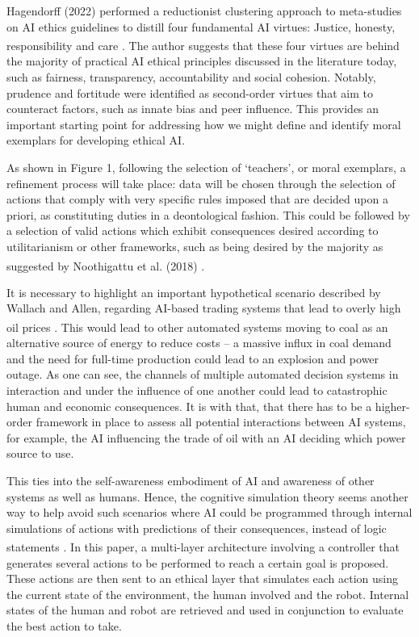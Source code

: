 \documentclass[10pt]{article}
\begin{document}
Hagendorff (2022) performed a reductionist clustering approach to meta-studies on AI ethics guidelines to distill four fundamental AI virtues: Justice, honesty, responsibility and care \textsuperscript{\cite{hagendorff_virtue-based_2022}}. The author suggests that these four virtues are behind the majority of practical AI ethical principles discussed in the literature today, such as fairness, transparency, accountability and social cohesion. Notably, prudence and fortitude were identified as second-order virtues that aim to counteract factors, such as innate bias and peer influence. This provides an important starting point for addressing how we might define and identify moral exemplars for developing ethical AI.

As shown in Figure 1, following the selection of ‘teachers’, or moral exemplars, a refinement process will take place: data will be chosen through the selection of actions that comply with very specific rules imposed that are decided upon a priori, as constituting duties in a deontological fashion. This could be followed by a selection of valid actions which exhibit consequences desired according to utilitarianism or other frameworks, such as being desired by the majority as suggested by Noothigattu et al. (2018) \textsuperscript{\cite{noothigattu_voting-based_2018}}.

It is necessary to highlight an important hypothetical scenario described by Wallach and Allen, regarding AI-based trading systems that lead to overly high oil prices \textsuperscript{\cite{wallach_moral_2009}}. This would lead to other automated systems moving to coal as an alternative source of energy to reduce costs – a massive influx in coal demand and the need for full-time production could lead to an explosion and power outage. As one can see, the channels of multiple automated decision systems in interaction and under the influence of one another could lead to catastrophic human and economic consequences. It is with that, that there has to be a higher-order framework in place to assess all potential interactions between AI systems, for example, the AI influencing the trade of oil with an AI deciding which power source to use.

This ties into the self-awareness embodiment of AI and awareness of other systems as well as humans. Hence, the cognitive simulation theory seems another way to help avoid such scenarios where AI could be programmed through internal simulations of actions with predictions of their consequences, instead of logic statements \textsuperscript{\cite{vanderelst_architecture_2018}}. In this paper, a multi-layer architecture involving a controller that generates several actions to be performed to reach a certain goal is proposed. These actions are then sent to an ethical layer that simulates each action using the current state of the environment, the human involved and the robot. Internal states of the human and robot are retrieved and used in conjunction to evaluate the best action to take. 
\end{document}
